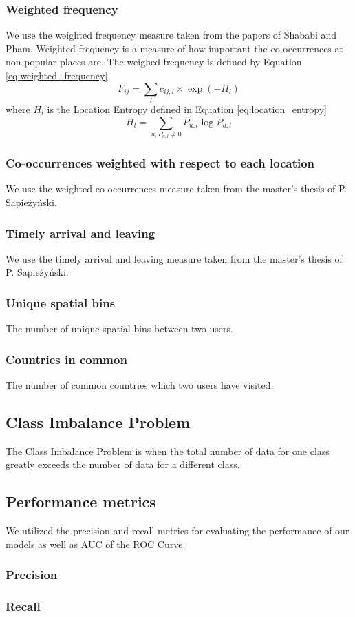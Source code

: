 \subsubsection{Weighted frequency}
We use the weighted frequency measure taken from the papers of Shababi and Pham\cite{iRWRfSD}\cite{AEBMtISSfSD}.
Weighted frequency is a measure of how important the co-occurrences at non-popular places are.
The weighed frequency is defined by Equation \ref{eq:weighted_frequency}
\begin{equation}
\label{eq:weighted_frequency}
F_{ij}=\sum\limits_{l}c_{ij,l} \times \exp(-H_l)
\end{equation}
where $H_l$ is the Location Entropy defined in Equation \ref{eq:location_entropy}
\begin{equation}
\label{eq:location_entropy}
H_l = \sum\limits_{u, P_{u,l}\neq0} P_{u,l}\log P_{u,l}
\end{equation}
\subsubsection{Co-occurrences weighted with respect to each location}
We use the weighted co-occurrences measure taken from the master's thesis of P. Sapieżyński\cite{IMM2013-06556}.

\subsubsection{Timely arrival and leaving}
We use the timely arrival and leaving measure taken from the master's thesis of P. Sapieżyński\cite{IMM2013-06556}.

\subsubsection{Unique spatial bins}
The number of unique spatial bins between two users.

\subsubsection{Countries in common}
The number of common countries which two users have visited.

\subsection{Class Imbalance Problem}
The Class Imbalance Problem is when the total number of data for one class greatly exceeds the number of data for a different class.

\subsection{Performance metrics}
We utilized the precision and recall metrics for evaluating the performance of our models as well as AUC of the ROC Curve.
\subsubsection{Precision}

\subsubsection{Recall}